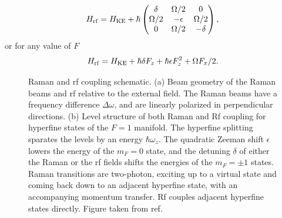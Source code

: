 \begin{equation}
H_{\rm rf} = H_{\rm KE} + \hbar
 \begin{pmatrix} \delta & \Omega/2  &  0  \\ 
\Omega/2 & -\epsilon &  \Omega/2 \\
 0 & \Omega/2  & -\delta  \\
 \end{pmatrix} \\,
\label{eqn:rfHam}
\end{equation}
or for any value of $F$
\begin{equation}
H_{\rm rf} = H_{\rm KE} + \hbar\delta F_z + \hbar \epsilon F^2_z + \Omega F_x/2.
\end{equation}

\begin{figure}
\caption[Raman and rf coupling schematic]{Raman and rf coupling schematic. (a) Beam geometry of the Raman beams and rf relative to the external field. The Raman beams have a frequency difference $\Delta\omega$, and are linearly polarized in perpendicular directions. (b) Level structure of both Raman and Rf coupling for hyperfine states of the $F=1$ manifold. The hyperfine splitting sparates  the levels by an energy $\hbar\omega_z$. The quadratic Zeeman shift $\epsilon$ lowers the energy of the $m_F=0$ state, and the detuning $\delta$ of either the Raman or the rf fields shifts the energies of the $m_F=\pm1$ states. Raman transitions are two-photon, exciting up to a virtual state and coming back down to an adjacent hyperfine state, with an accompanying momentum transfer. Rf couples adjacent hyperfine states directly. Figure taken from ref. \cite{Karina2012}}
\label{fig:RamanRfSchematic}
\end{figure}

